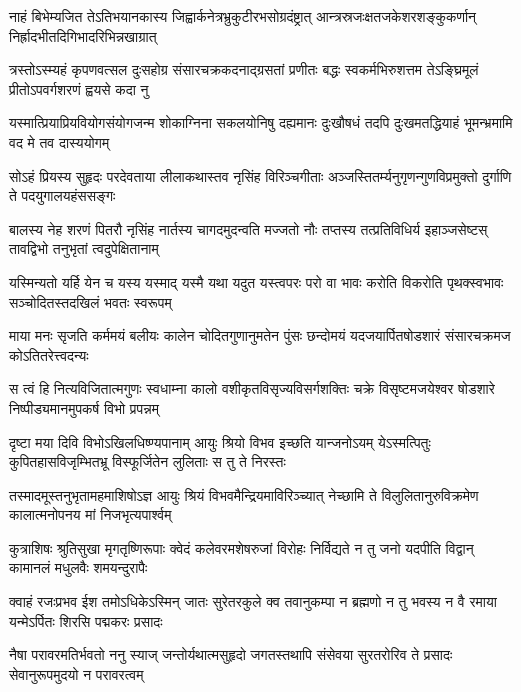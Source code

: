 \fourlineindentedshloka
{नाहं बिभेम्यजित तेऽतिभयानकास्य}
{जिह्वार्कनेत्रभ्रुकुटीरभसोग्रदंष्ट्रात्}
{आन्त्रस्रजःक्षतजकेशरशङ्कुकर्णान्}
{निर्ह्रादभीतदिगिभादरिभिन्नखाग्रात्} %

\fourlineindentedshloka
{त्रस्तोऽस्म्यहं कृपणवत्सल दुःसहोग्र}
{संसारचक्रकदनाद्ग्रसतां प्रणीतः}
{बद्धः स्वकर्मभिरुशत्तम तेऽङ्घ्रिमूलं}
{प्रीतोऽपवर्गशरणं ह्वयसे कदा नु} %

\fourlineindentedshloka
{यस्मात्प्रियाप्रियवियोगसंयोगजन्म}
{शोकाग्निना सकलयोनिषु दह्यमानः}
{दुःखौषधं तदपि दुःखमतद्धियाहं}
{भूमन्भ्रमामि वद मे तव दास्ययोगम्} %

\fourlineindentedshloka
{सोऽहं प्रियस्य सुहृदः परदेवताया}
{लीलाकथास्तव नृसिंह विरिञ्चगीताः}
{अञ्जस्तितर्म्यनुगृणन्गुणविप्रमुक्तो}
{दुर्गाणि ते पदयुगालयहंससङ्गः} %

\fourlineindentedshloka
{बालस्य नेह शरणं पितरौ नृसिंह}
{नार्तस्य चागदमुदन्वति मज्जतो नौः}
{तप्तस्य तत्प्रतिविधिर्य इहाञ्जसेष्टस्}
{तावद्विभो तनुभृतां त्वदुपेक्षितानाम्} %

\fourlineindentedshloka
{यस्मिन्यतो यर्हि येन च यस्य यस्माद्}
{यस्मै यथा यदुत यस्त्वपरः परो वा}
{भावः करोति विकरोति पृथक्स्वभावः}
{सञ्चोदितस्तदखिलं भवतः स्वरूपम्} %

\fourlineindentedshloka
{माया मनः सृजति कर्ममयं बलीयः}
{कालेन चोदितगुणानुमतेन पुंसः}
{छन्दोमयं यदजयार्पितषोडशारं}
{संसारचक्रमज कोऽतितरेत्त्वदन्यः} %

\fourlineindentedshloka
{स त्वं हि नित्यविजितात्मगुणः स्वधाम्ना}
{कालो वशीकृतविसृज्यविसर्गशक्तिः}
{चक्रे विसृष्टमजयेश्वर षोडशारे}
{निष्पीड्यमानमुपकर्ष विभो प्रपन्नम्} %

\fourlineindentedshloka
{दृष्टा मया दिवि विभोऽखिलधिष्ण्यपानाम्}
{आयुः श्रियो विभव इच्छति यान्जनोऽयम्}
{येऽस्मत्पितुः कुपितहासविजृम्भितभ्रू}
{विस्फूर्जितेन लुलिताः स तु ते निरस्तः} %

\fourlineindentedshloka
{तस्मादमूस्तनुभृतामहमाशिषोऽज्ञ}
{आयुः श्रियं विभवमैन्द्रियमाविरिञ्च्यात्}
{नेच्छामि ते विलुलितानुरुविक्रमेण}
{कालात्मनोपनय मां निजभृत्यपार्श्वम्} %

\fourlineindentedshloka
{कुत्राशिषः श्रुतिसुखा मृगतृष्णिरूपाः}
{क्वेदं कलेवरमशेषरुजां विरोहः}
{निर्विद्यते न तु जनो यदपीति विद्वान्}
{कामानलं मधुलवैः शमयन्दुरापैः} %

\fourlineindentedshloka
{क्वाहं रजःप्रभव ईश तमोऽधिकेऽस्मिन्}
{जातः सुरेतरकुले क्व तवानुकम्पा}
{न ब्रह्मणो न तु भवस्य न वै रमाया}
{यन्मेऽर्पितः शिरसि पद्मकरः प्रसादः} %

\fourlineindentedshloka
{नैषा परावरमतिर्भवतो ननु स्याज्}
{जन्तोर्यथात्मसुहृदो जगतस्तथापि}
{संसेवया सुरतरोरिव ते प्रसादः}
{सेवानुरूपमुदयो न परावरत्वम्} %

